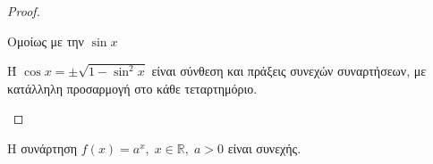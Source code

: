 \documentclass[main.tex]{subfiles}
\begin{document}
        \begin{proof}
        \item {}
            \begin{myitemize}
            \item Ομοίως με την $ \sin{x} $
            \item Ή $ \cos{x} = \pm \sqrt{1- \sin^{2}{x}} $ είναι σύνθεση και 
                πράξεις συνεχών συναρτήσεων, με κατάλληλη προσαρμογή στο 
                κάθε τεταρτημόριο.
            \end{myitemize}
        \end{proof}

        \begin{prop}
            Η συνάρτηση $ f(x) = a^{x}, \; x \in \mathbb{R}, \; a>0 $ είναι συνεχής.
        \end{prop}
\end{document}
